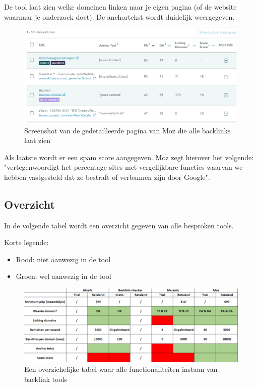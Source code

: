 De tool laat zien welke domeinen linken naar je eigen pagina (of de website waarnaar je onderzoek doet). De anchortekst wordt duidelijk weergegeven. 

\begin{figure}[h!]
\centering
\includegraphics[width=\linewidth]{img/mozbacklinks.PNG}
\caption{Screenshot van de gedetailleerde pagina van Moz die alle backlinks laat zien
\autocite{moz}}
\end{figure}

Als laatste wordt er een spam score aangegeven. Moz zegt hierover het volgende: "vertegenwoordigt het percentage sites met vergelijkbare functies waarvan we hebben vastgesteld dat ze bestraft of verbannen zijn door Google".

\subsection{Overzicht}
\label{ch: Overzicht}

In de volgende tabel wordt een overzicht gegeven van alle besproken tools. 

Korte legende: 
\begin{itemize}
\item Rood: niet aanwezig in de tool
\item Groen: wel aanwezig in de tool
\end{itemize}

\begin{figure}[h!]
\centering
\includegraphics[width=\linewidth]{img/linkbuildingtabel.PNG}
\caption{Een overzichelijke tabel waar alle functionaliteiten instaan van backlink tools}
\end{figure}

